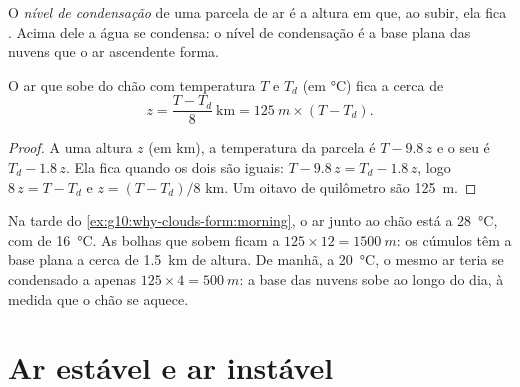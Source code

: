 \begin{definition}\label{def:g10:why-clouds-form:condensation-level}
O \emph{nível de condensação}
de uma parcela de ar é a altura em que, ao subir, ela fica . Acima
dele a água se condensa: o nível de condensação é a base plana das nuvens
que o ar ascendente forma.
\end{definition}

\begin{proposition}\label{prop:g10:why-clouds-form:lcl}
O ar que sobe do chão com temperatura $T$ e  $T_d$
(em \unit{\degreeCelsius}) fica  a cerca de
\[
  z = \frac{T - T_d}{8}\ \text{km} = \qty{125}{m} \times (T - T_d).
\]
\end{proposition}

\begin{proof}
A uma altura $z$ (em km), a temperatura da parcela é $T - 9.8\,z$ e o seu
 é $T_d - 1.8\,z$. Ela fica  quando os dois são
iguais: $T - 9.8\,z = T_d - 1.8\,z$, logo $8\,z = T - T_d$ e
$z = (T - T_d)/8$ km. Um oitavo de quilômetro são \qty{125}{m}.
\end{proof}

\begin{example}\label{ex:g10:why-clouds-form:base}
Na tarde do \cref{ex:g10:why-clouds-form:morning}, o ar junto ao chão está
a \qty{28}{\degreeCelsius}, com  de \qty{16}{\degreeCelsius}.
As bolhas que sobem ficam  a $125 \times 12 = \qty{1500}{m}$: os
cúmulos têm a base plana a cerca de \qty{1.5}{km} de altura. De manhã, a
\qty{20}{\degreeCelsius}, o mesmo ar teria se condensado a apenas
$125 \times 4 = \qty{500}{m}$: a base das nuvens sobe ao longo do dia, à
medida que o chão se aquece.
\end{example}

\section{Ar estável e ar instável}

